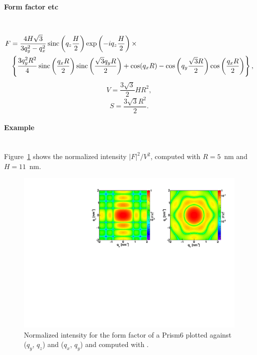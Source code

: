 \paragraph{Form factor etc}\strut\\
\begin{align*}
F &= \frac{4H\sqrt{3}}{3q_y^2 - q_x^2}
\operatorname{sinc}\left(q_z\frac{H}{2}\right) \exp\left(-i q_z\frac{ H}{2}\right)\times\\
&\left\{\frac{3q_y^2R^2}{4} \operatorname{sinc}\left(\frac{q_x
  R}{2}\right)\operatorname{sinc}\left(\frac{\sqrt{3}q_yR }{2}\right)+ \cos(q_x R)-\cos\left(q_y
\frac{\sqrt{3}R}{2}\right) \cos\left(\frac{q_x R}{2}\right)\right\},
\end{align*}
\begin{equation*}
  V = \dfrac{3\sqrt{3}}{2}H R^2,
\end{equation*}
\begin{equation*}
  S =\dfrac{3\sqrt{3}R^2}{2}.
\end{equation*}

\paragraph{Example}\strut\\
Figure~\ref{fig:FFprism6Ex} shows the normalized intensity
$|F|^2/V^2$, computed with $R=5$~nm and \mbox{$H=11$~nm.}

\begin{figure}[H]
\begin{center}
\includegraphics[angle=-90,width=\textwidth]{fig/ff/figffprism6.pdf}
\end{center}
\caption{Normalized intensity for the form factor of a Prism6 plotted against ($q_y$, $q_z$) and ($q_x$, $q_y$) and computed with .}
\label{fig:FFprism6Ex}
\end{figure}

